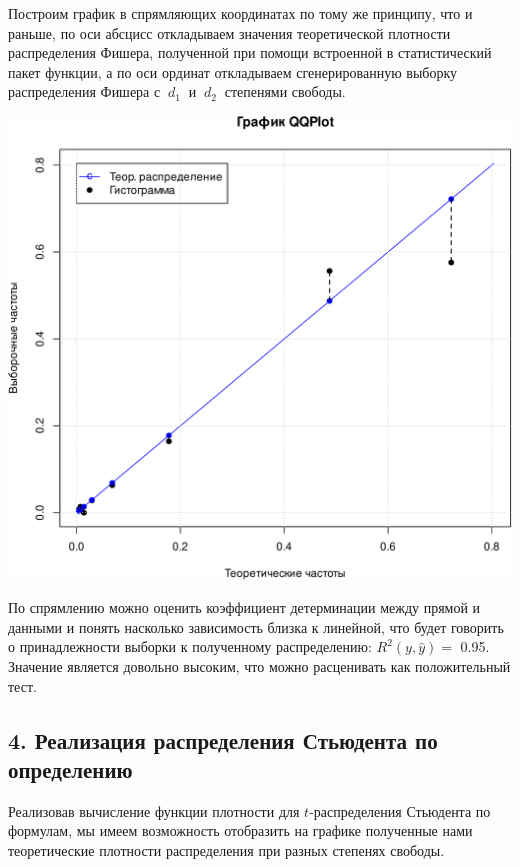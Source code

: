\documentclass[
]{article}
\begin{document}
Построим график в спрямляющих координатах по тому же принципу, что и
раньше, по оси абсцисс откладываем значения теоретической плотности
распределения Фишера, полученной при помощи встроенной в статистический
пакет функции, а по оси ординат откладываем сгенерированную выборку
распределения Фишера с \(\ d_1\ \) и \(\ d_2\ \) степенями свободы.

\begin{center}\includegraphics[width=0.6\linewidth]{Prac4_files/figure-latex/unnamed-chunk-8-1} \end{center}

По спрямлению можно оценить коэффициент детерминации между прямой и
данными и понять насколько зависимость близка к линейной, что будет
говорить о принадлежности выборки к полученному распределению:
\(R^2(y, \hat{y}) =\) 0.95. Значение является довольно высоким, что
можно расценивать как положительный тест.

\hypertarget{ux440ux435ux430ux43bux438ux437ux430ux446ux438ux44f-ux440ux430ux441ux43fux440ux435ux434ux435ux43bux435ux43dux438ux44f-ux441ux442ux44cux44eux434ux435ux43dux442ux430-ux43fux43e-ux43eux43fux440ux435ux434ux435ux43bux435ux43dux438ux44e}{%
\subsection{4. Реализация распределения Стьюдента по
определению}\label{ux440ux435ux430ux43bux438ux437ux430ux446ux438ux44f-ux440ux430ux441ux43fux440ux435ux434ux435ux43bux435ux43dux438ux44f-ux441ux442ux44cux44eux434ux435ux43dux442ux430-ux43fux43e-ux43eux43fux440ux435ux434ux435ux43bux435ux43dux438ux44e}}

Реализовав вычисление функции плотности для \(t\)-распределения
Стьюдента по формулам, мы имеем возможность отобразить на графике
полученные нами теоретические плотности распределения при разных
степенях свободы.
\end{document}
